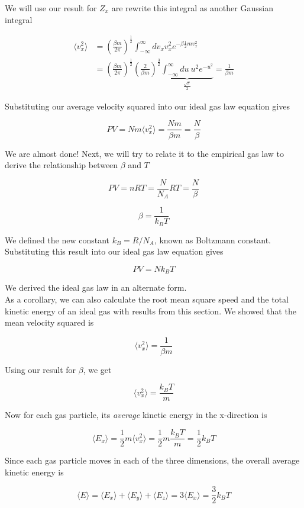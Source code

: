 We will use our result for $Z_x$ are rewrite this integral as another Gaussian integral

\begin{align*}
	\langle v_x^2 \rangle &= \left( \frac{\beta m}{2\pi} \right)^{\frac12} \int_{-\infty}^\infty dv_x v_x^2 e^{-\beta \frac{1}{2}m v_x^2} \\
	&= \left( \frac{\beta m}{2\pi} \right)^{\frac12} \left( \frac{2}{\beta m} \right)^{\frac32} \underbrace{\int_{-\infty}^\infty du \: u^2 e^{-u^2}}_{\frac{\sqrt{\pi}}{2}} = \frac{1}{\beta m}
\end{align*}

Substituting our average velocity squared into our ideal gas law equation gives

$$PV=Nm\langle v_x^2 \rangle=\frac{Nm}{\beta m}=\frac{N}{\beta}$$

We are almost done! Next, we will try to relate it to the empirical gas law to derive the relationship between $\beta$ and $T$

$$PV=nRT=\frac{N}{N_A}RT=\frac{N}{\beta}$$

$$\boxed{\beta=\frac{1}{k_BT}}$$

We defined the new constant $k_B=R/N_A$, known as Boltzmann constant. Substituting this result into our ideal gas law equation gives

$$\boxed{PV=Nk_BT}$$

We derived the ideal gas law in an alternate form. \\

As a corollary, we can also calculate the root mean square speed and the total kinetic energy of an ideal gas with results from this section. We showed that the mean velocity squared is

$$\langle v_x^2 \rangle=\frac{1}{\beta m}$$

Using our result for $\beta$, we get

$$\langle v_x^2 \rangle=\frac{k_BT}{m}$$

Now for each gas particle, its \textit{average} kinetic energy in the x-direction is

$$\langle E_x \rangle = \frac12m\langle v_x^2 \rangle = \frac12m\frac{k_BT}{m}=\frac12k_BT$$

Since each gas particle moves in each of the three dimensions, the overall average kinetic energy is

$$\langle E \rangle = \langle E_x \rangle + \langle E_y \rangle + \langle E_z \rangle = 3\langle E_x \rangle = \frac32k_BT$$

